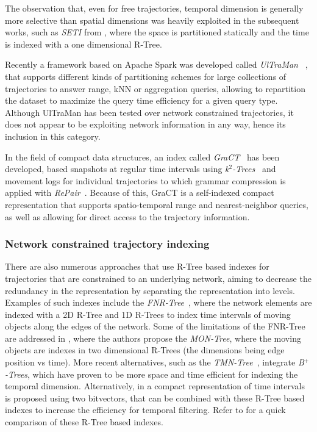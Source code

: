 \documentclass[runningheads]{llncs}
\begin{document}
The observation that, even for free trajectories, temporal dimension is generally more selective than spatial dimensions was heavily exploited in the subsequent works, such as {\em SETI} from \cite{chakka2003indexing}, where the space is partitioned statically and the time is indexed with a one dimensional R-Tree.

Recently a framework based on Apache Spark was developed called {\em UlTraMan}~ \cite{ding2018ultraman}, that supports different kinds of partitioning schemes for large collections of trajectories to answer range, kNN or aggregation queries, allowing to repartition the dataset to maximize the query time efficiency for a given query type. Although UlTraMan has been tested over network constrained trajectories, it does not appear to be exploiting network information in any way, hence its inclusion in this category.

In the field of compact data structures, an index called {\em GraCT}~\cite{brisaboa2019gract} has been developed, based snapshots at regular time intervals using {\em k$^2$-Trees}~\cite{brisaboa2009k} and movement logs for individual trajectories to which grammar compression is applied with {\em RePair}~\cite{larsson2000off}. Because of this, GraCT is a self-indexed compact representation that supports spatio-temporal range and nearest-neighbor queries, as well as allowing for direct access to the trajectory information.

\subsubsection{Network constrained trajectory indexing}
There are also numerous approaches that use R-Tree based indexes for trajectories that are constrained to an underlying network, aiming to decrease the redundancy in the representation by separating the representation into levels. Examples of such indexes include the {\em FNR-Tree}~\cite{DBLP:conf/ssd/Frentzos03}, where the network elements are indexed with a 2D R-Tree and 1D R-Trees to index time intervals of moving objects along the edges of the network. Some of the limitations of the FNR-Tree are addressed in \cite{DBLP:journals/geoinformatica/AlmeidaG05}, where the authors propose the {\em MON-Tree}, where the moving objects are indexes in two dimensional R-Trees (the dimensions being edge position vs time). More recent alternatives, such as the {\em TMN-Tree}~\cite{chang2010tmn}, integrate {\em B$^+$-Trees}, which have proven to be more space and time efficient for indexing the temporal dimension. Alternatively, in \cite{rivera2018faster} a compact representation of time intervals is proposed using two bitvectors, that can be combined with these R-Tree based indexes to increase the efficiency for temporal filtering. Refer to \cite{john2017performance} for a quick comparison of these R-Tree based indexes.
\end{document}
